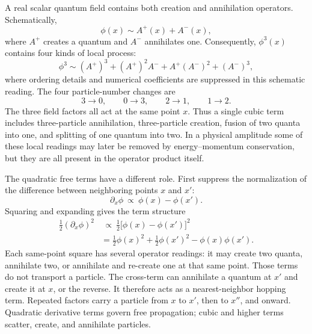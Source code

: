 A real scalar quantum field contains both creation and annihilation operators. Schematically,
\begin{equation}
\phi(x)\sim A^+(x)+A^-(x),
\end{equation}
where \(A^+\) creates a quantum and \(A^-\) annihilates one. Consequently, \(\phi^3(x)\) contains four kinds of local process:
\begin{equation}
\phi^3
\sim
(A^+)^3+(A^+)^2A^-+A^+(A^-)^2+(A^-)^3,
\end{equation}
where ordering details and numerical coefficients are suppressed in this schematic reading. The four particle-number changes are
\begin{equation}
3\longrightarrow0,
\qquad
0\longrightarrow3,
\qquad
2\longrightarrow1,
\qquad
1\longrightarrow2.
\end{equation}
The three field factors all act at the same point \(x\). Thus a single cubic term includes three-particle annihilation, three-particle creation, fusion of two quanta into one, and splitting of one quantum into two. In a physical amplitude some of these local readings may later be removed by energy--momentum conservation, but they are all present in the operator product itself.

The quadratic free terms have a different role. First suppress the normalization of the difference between neighboring points \(x\) and \(x'\):
\begin{equation}
\partial_x\phi
\ \propto\
\phi(x)-\phi(x').
\end{equation}
Squaring and expanding gives the term structure
\begin{align}
\frac12(\partial_x\phi)^2
&\ \propto\
\frac12\bigl[\phi(x)-\phi(x')\bigr]^2
\\
&=
\frac12\phi(x)^2
+\frac12\phi(x')^2
-\phi(x)\phi(x').
\end{align}
Each same-point square has several operator readings: it may create two quanta, annihilate two, or annihilate and re-create one at that same point. Those terms do not transport a particle. The cross-term can annihilate a quantum at \(x'\) and create it at \(x\), or the reverse. It therefore acts as a nearest-neighbor hopping term. Repeated factors carry a particle from \(x\) to \(x'\), then to \(x''\), and onward. Quadratic derivative terms govern free propagation; cubic and higher terms scatter, create, and annihilate particles.

\begin{classroomqa}
\end{classroomqa}

